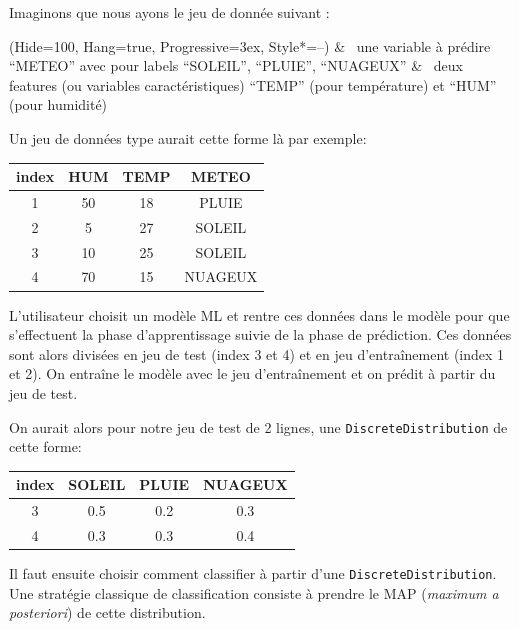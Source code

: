Imaginons que nous ayons le jeu de donnée suivant : 
\begin{easylist}
\ListProperties(Hide=100, Hang=true, Progressive=3ex, Style*=--)
& ~une variable à prédire “METEO” avec pour labels “SOLEIL”, “PLUIE”, “NUAGEUX”
& ~deux features (ou variables caractéristiques) “TEMP” (pour température) et “HUM” (pour humidité)
\end{easylist}

Un jeu de données type aurait cette forme là par exemple:

\begin{center}
\begin{tabular}{cccc}
\rowcolor[RGB]{200, 200, 200}index & HUM & TEMP & METEO \\
\hline
1 & 50 & 18 & PLUIE \\
2 & 5 & 27 & SOLEIL \\
3 & 10 & 25 & SOLEIL \\
4 & 70 & 15 & NUAGEUX

\end{tabular}
\label{tab1}
\end{center}

L’utilisateur choisit un modèle ML et rentre ces données dans le modèle pour que s’effectuent la phase d’apprentissage suivie de la phase de prédiction.
Ces données sont alors divisées en jeu de test (index 3 et 4) et en jeu d’entraînement (index 1 et 2). On entraîne le modèle avec le jeu d’entraînement et on prédit à partir du jeu de test.

On aurait alors pour notre jeu de test de 2 lignes, une \texttt{DiscreteDistribution} de cette forme:

\begin{center}
\begin{tabular}{cccc}
\rowcolor[RGB]{200, 200, 200}index & SOLEIL & PLUIE & NUAGEUX \\
\hline
3 & 0.5 & 0.2 & 0.3 \\
4 & 0.3 & 0.3 & 0.4

\end{tabular}
\label{tab2}
\end{center}

Il faut ensuite choisir comment classifier à partir d’une \texttt{DiscreteDistribution}. Une stratégie classique de classification consiste à prendre le MAP (\textit{maximum a posteriori}) de cette distribution.

